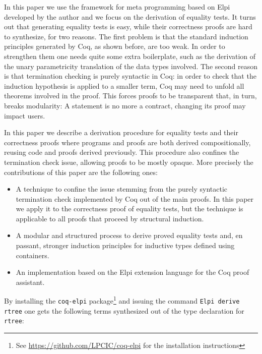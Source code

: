 \documentclass[a4paper,UKenglish,cleveref, autoref]{lipics-v2019}
\begin{document}
In this paper we use the framework for meta programming based on
Elpi~\cite{dunchev:hal-01176856,tassi:hal-01637063} developed by the
author and we focus on the derivation of equality tests.
It turns out that generating equality tests is easy,
while their correctness proofs are hard to synthesize, for two reasons. 
The first problem is that 
the standard induction principles generated by Coq, as shown
before, are too weak. In order to strengthen them one needs quite some extra
boilerplate, such as the derivation of the unary parametricity
translation of the data types involved.
The second reason is that termination checking
is purely syntactic in Coq: %
in order to check that the induction
hypothesis is applied to a smaller term, Coq may need to unfold all
theorems involved in the proof. This forces proofs to
be transparent that, in turn, breaks modularity: A statement is no more a
contract, changing its proof may impact users.

In this paper we describe a derivation procedure for equality tests
and their correctness proofs
where programs and proofs are both
derived compositionally, reusing code and proofs derived previously.
This procedure also confines the termination check issue,
allowing proofs to be mostly opaque.
More precisely the contributions of this paper are the following ones:
\begin{itemize}
\item A technique to confine the issue stemming from the purely syntactic
	termination check implemented by Coq out of the
	main proofs. In this paper we apply it to the correctness
	proof of equality
	tests, but the technique is applicable to all proofs 
	that proceed by structural
	induction.

\item A modular and structured process to derive proved equality tests
		and, en passant, stronger
	induction principles for inductive types defined using
	containers.

\item An implementation based on the Elpi extension language
	for the Coq proof assistant.
\end{itemize}

\noindent
By installing the \lstinline+coq-elpi+
package\footnote{See \url{https://github.com/LPCIC/coq-elpi} for the
installation instructions} 
and issuing the command \lstinline+Elpi derive rtree+
one gets the following terms synthesized
out of the type declaration for \lstinline+rtree+:
\end{document}

